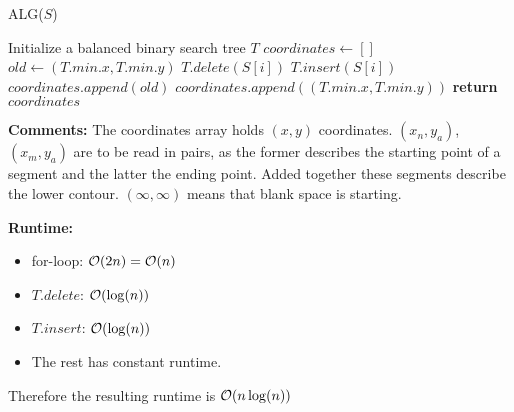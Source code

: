 \begin{algorithm}
    \caption{ALG($S$)}
    \begin{algorithmic}[1]
        \State Initialize a balanced binary search tree $T$
        \State $coordinates \gets []$ 
        \State $old \gets (T.min.x, T.min.y)$
        \State $T.delete(S[i])$
        \Else
        \State $T.insert(S[i])$
        \EndIf
        \State $coordinates.append(old)$
        \EndIf
        \State $coordinates.append((T.min.x,T.min.y))$
        \EndFor
        \State \textbf{return} $coordinates$
    \end{algorithmic}
\end{algorithm}

\textbf{Comments:}
The coordinates array holds $(x,y)$ coordinates.
$(x_n, y_a)$, $(x_m, y_a)$ are to be read in pairs, as the former describes the starting point of a segment and the latter the ending point.
Added together these segments describe the lower contour. $(\infty, \infty)$ means that blank space is starting.

\hspace{1cm}

\textbf{Runtime:}






\begin{itemize}
    \item for-loop: $\mathcal{O}(2n) = \mathcal{O}(n)$
    \item $T.delete$: $\mathcal{O}(\log(n))$
    \item $T.insert$: $\mathcal{O}(\log(n))$
    \item The rest has constant runtime.
\end{itemize}

Therefore the resulting runtime is $\mathcal{O}(n\log(n))$